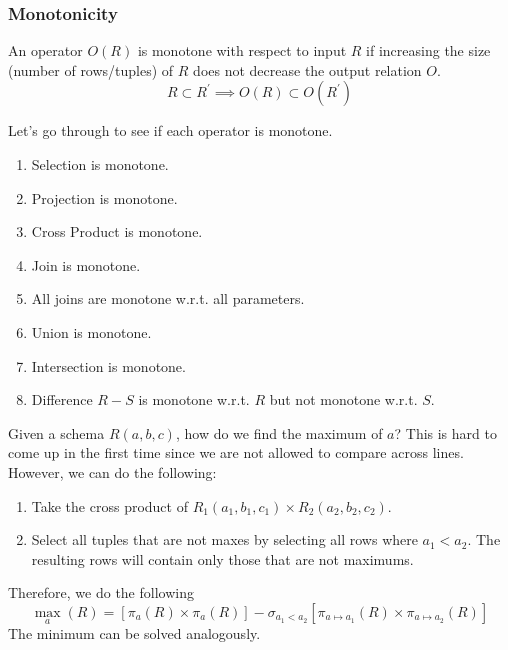   \subsubsection{Monotonicity}
    
    \begin{definition}
      An operator $O(R)$ is monotone with respect to input $R$ if increasing the size (number of rows/tuples) of $R$ does not decrease the output relation $O$.  
      \begin{equation}
        R \subset R^\prime \implies O(R) \subset O(R^\prime)
      \end{equation}
    \end{definition}

    \begin{example}
      Let's go through to see if each operator is monotone. 
      \begin{enumerate}
        \item Selection is monotone. 
        \item Projection is monotone. 
        \item Cross Product is monotone. 
        \item Join is monotone. 
        \item All joins are monotone w.r.t. all parameters. 
        \item Union is monotone. 
        \item Intersection is monotone. 
        \item Difference $R - S$ is monotone w.r.t. $R$ but not monotone w.r.t. $S$.
      \end{enumerate}
    \end{example}

    \begin{example}
      Given a schema $R(a, b, c)$, how do we find the maximum of $a$? This is hard to come up in the first time since we are not allowed to compare across lines. However, we can do the following: 
      \begin{enumerate}
        \item Take the cross product of $R_1 (a_1, b_1, c_1) \times R_2 (a_2, b_2, c_2)$. 
        \item Select all tuples that are not maxes by selecting all rows where $a_1 < a_2$. The resulting rows will contain only those that are not maximums. 
      \end{enumerate}
      Therefore, we do the following 
      \begin{equation}
        \max_a (R) = [\pi_a (R) \times \pi_a (R)] - \sigma_{a_1 < a_2} [\pi_{a \mapsto a_1} (R) \times \pi_{a \mapsto a_2} (R)]
      \end{equation}
      The minimum can be solved analogously. 
    \end{example}

